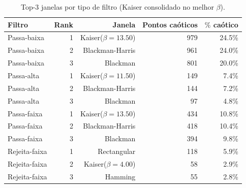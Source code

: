 \begin{table}[htbp]
  \centering
  \caption{Top-3 janelas por tipo de filtro (Kaiser consolidado no melhor $\beta$).}
  \begin{tabular}{lrrrr}
    \toprule
    Filtro & Rank & Janela & Pontos caóticos & $\%$ caótico \\
    \midrule
    Passa-baixa & 1 & Kaiser($\beta=13.50$) & 979 & 24.5\% \\
    Passa-baixa & 2 & Blackman-Harris & 961 & 24.0\% \\
    Passa-baixa & 3 & Blackman & 801 & 20.0\% \\
    Passa-alta & 1 & Kaiser($\beta=11.50$) & 149 & 7.4\% \\
    Passa-alta & 2 & Blackman-Harris & 144 & 7.2\% \\
    Passa-alta & 3 & Blackman & 97 & 4.8\% \\
    Passa-faixa & 1 & Kaiser($\beta=13.50$) & 434 & 10.8\% \\
    Passa-faixa & 2 & Blackman-Harris & 418 & 10.4\% \\
    Passa-faixa & 3 & Blackman & 394 & 9.8\% \\
    Rejeita-faixa & 1 & Rectangular & 118 & 5.9\% \\
    Rejeita-faixa & 2 & Kaiser($\beta=4.00$) & 58 & 2.9\% \\
    Rejeita-faixa & 3 & Hamming & 55 & 2.8\% \\
    \bottomrule
  \end{tabular}
\end{table}
